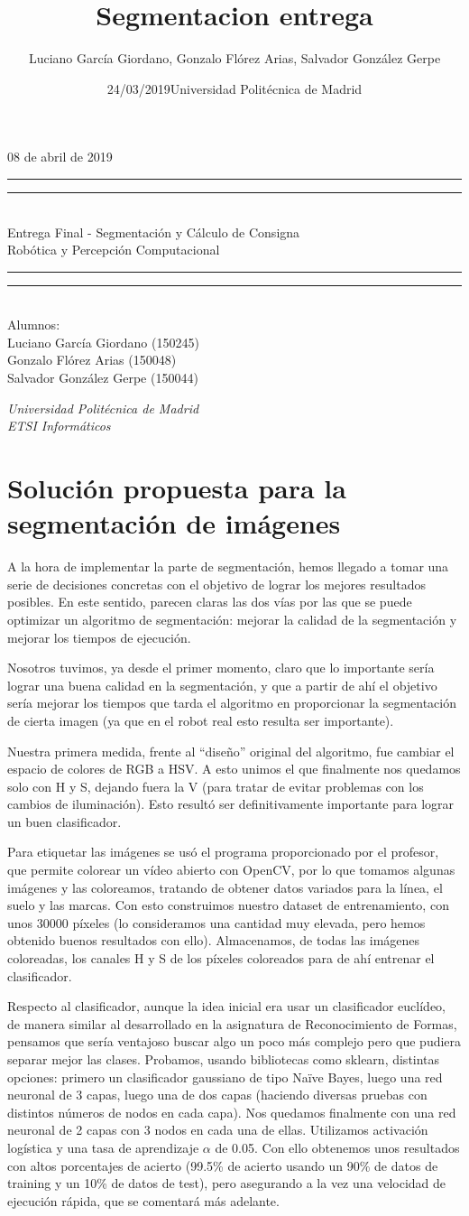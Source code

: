\documentclass{article}
\title{Segmentacion entrega}
\author{Luciano García Giordano, Gonzalo Flórez Arias, Salvador González Gerpe}
\date{24/03/2019}
\date{Universidad Politécnica de Madrid}
\newcommand*{\frontPageEC}[2]{
    \begingroup %
        \centering %
        \vspace*{\baselineskip} %
        {\begin{flushright} \LARGE #1  \end{flushright}}
        \vspace*{\baselineskip}
        \rule{\textwidth}{1.6pt}\vspace*{-\baselineskip}\vspace*{2pt} %
        \rule{\textwidth}{0.4pt}\\[\baselineskip] %
        {\LARGE #2  \\[0.8\baselineskip] \large{Robótica y Percepción Computacional}}\\[0.2\baselineskip] %
        \rule{\textwidth}{0.4pt}\vspace*{-\baselineskip}\vspace{3.2pt} %
        \rule{\textwidth}{1.6pt}\\[\baselineskip] %
        \vspace*{2\baselineskip} %
        Alumnos: \\[\baselineskip]
        {\Large Luciano García Giordano (150245)} \\
        {\Large Gonzalo Flórez Arias (150048)} \\
        {\Large Salvador González Gerpe (150044)} \\
        
        \vfill
        
        {\itshape Universidad Politécnica de Madrid \\ ETSI Informáticos\par} %
    \endgroup}
\begin{document}
\frontPageEC{08 de abril de 2019}{Entrega Final - Segmentación y Cálculo de Consigna}
\thispagestyle{empty}

\newpage
\tableofcontents
\setcounter{page}{1}

\clearpage
\newpage

\section{Solución propuesta para la segmentación de imágenes}

	A la hora de implementar la parte de segmentación, hemos llegado a tomar una serie de decisiones concretas con el objetivo de lograr los mejores resultados posibles. En este sentido, parecen claras las dos vías por las que se puede optimizar un algoritmo de segmentación: mejorar la calidad de la segmentación y mejorar los tiempos de ejecución.

	Nosotros tuvimos, ya desde el primer momento, claro que lo importante sería lograr una buena calidad en la segmentación, y que a partir de ahí el objetivo sería mejorar los tiempos que tarda el algoritmo en proporcionar la segmentación de cierta imagen (ya que en el robot real esto resulta ser importante). 

	Nuestra primera medida, frente al “diseño” original del algoritmo, fue cambiar el espacio de colores de RGB a HSV. A esto unimos el que finalmente nos quedamos solo con H y S, dejando fuera la V (para tratar de evitar problemas con los cambios de iluminación). Esto resultó ser definitivamente importante para lograr un buen clasificador.

	Para etiquetar las imágenes se usó el programa proporcionado por el profesor, que permite colorear un vídeo abierto con OpenCV, por lo que tomamos algunas imágenes y las coloreamos, tratando de obtener datos variados para la línea, el suelo y las marcas. Con esto construimos nuestro dataset de entrenamiento, con unos 30000 píxeles (lo consideramos una cantidad muy elevada, pero hemos obtenido buenos resultados con ello). Almacenamos, de todas las imágenes coloreadas, los canales H y S de los píxeles coloreados para de ahí entrenar el clasificador.

	Respecto al clasificador, aunque la idea inicial era usar un clasificador euclídeo, de manera similar al desarrollado en la asignatura de Reconocimiento de Formas, pensamos que sería ventajoso buscar algo un poco más complejo pero que pudiera separar mejor las clases. Probamos, usando bibliotecas como sklearn, distintas opciones: primero un clasificador gaussiano de tipo Naïve Bayes, luego una red neuronal de 3 capas, luego una de dos capas (haciendo diversas pruebas con distintos números de nodos en cada capa). Nos quedamos finalmente con una red neuronal de 2 capas con 3 nodos en cada una de ellas. Utilizamos activación logística y una tasa de aprendizaje $\alpha$ de 0.05. Con ello obtenemos unos resultados con altos porcentajes de acierto (99.5\% de acierto usando un 90\% de datos de training y un 10\% de datos de test), pero asegurando a la vez una velocidad de ejecución rápida, que se comentará más adelante.
\end{document}
